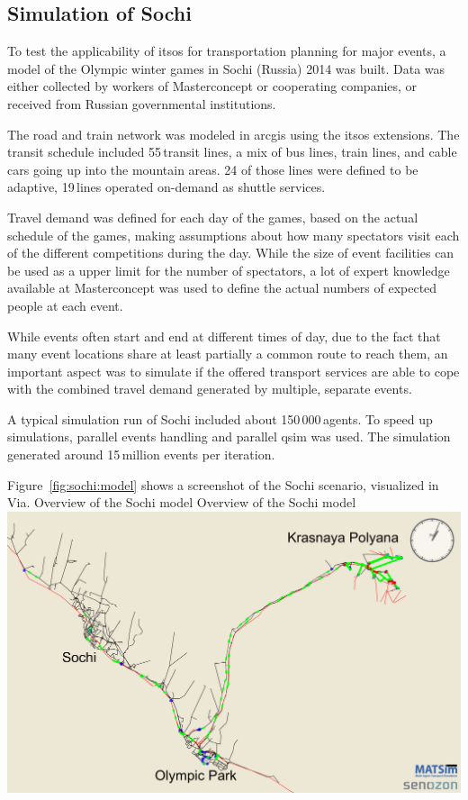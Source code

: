 \subsection{Simulation of Sochi}
To test the applicability of \gls{itsos} for transportation planning for major events,
a model of the Olympic winter games in Sochi (Russia) 2014 was built. Data was
either collected by workers of Masterconcept or cooperating companies, or
received from Russian governmental institutions.

The road and train network was modeled in \gls{arcgis} using the \gls{itsos} extensions.
The transit schedule included 55\,transit lines, a mix of bus lines, train lines,
and cable cars going up into the mountain areas. 24 of those lines were
defined to be adaptive, 19\,lines operated on-demand as shuttle services.

Travel demand was defined for each day of the games, based on the actual schedule of the games,
making assumptions about how many spectators visit each of the different
competitions during the day. While the size of event facilities can be used as a
upper limit for the number of spectators, a lot of expert knowledge available at
Masterconcept was used to define the actual numbers of expected people at each
event.

While events often start and end at different times of day, due to the fact that many event locations share at least partially a
common route to reach them, an important aspect was to simulate if the offered transport services are able to cope with the combined travel demand generated by multiple, separate events.

A typical simulation run of Sochi included about 150\,000\,agents. To speed up simulations, parallel events handling and parallel qsim was used. The simulation generated around 15\,million events per iteration.

Figure~\ref{fig:sochi:model} shows a screenshot of the Sochi scenario, visualized in Via.
%
\createfigure%
{Overview of the Sochi model}%
{Overview of the Sochi model}%
{\label{fig:sochi:model}}%
{\includegraphics[width=1.\textwidth,angle=0]{./using/figures/sochi_full.pdf}}%
{}
%

